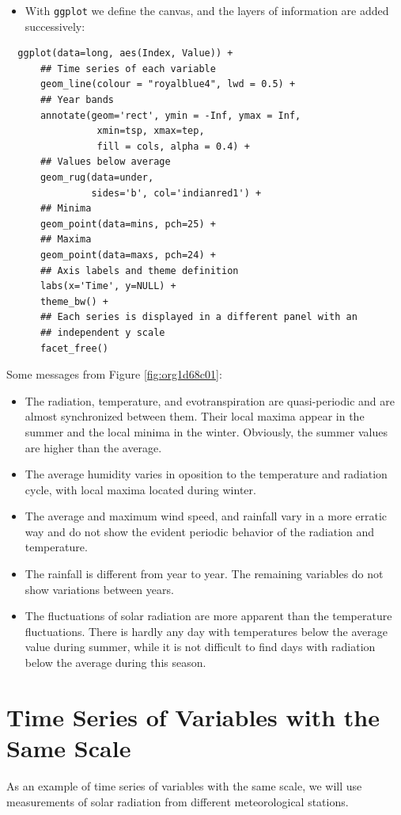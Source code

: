 \documentclass[smallroyalvopaper]{memoir}
\begin{document}
\begin{itemize}
\item With \texttt{ggplot} we define the canvas, and the layers of information are
added successively:
\end{itemize}
\lstset{language=r,label= ,caption= ,captionpos=b,numbers=none}
\begin{lstlisting}
  ggplot(data=long, aes(Index, Value)) +
      ## Time series of each variable
      geom_line(colour = "royalblue4", lwd = 0.5) +
      ## Year bands
      annotate(geom='rect', ymin = -Inf, ymax = Inf,
                xmin=tsp, xmax=tep,
                fill = cols, alpha = 0.4) +
      ## Values below average
      geom_rug(data=under,
               sides='b', col='indianred1') +
      ## Minima
      geom_point(data=mins, pch=25) +
      ## Maxima
      geom_point(data=maxs, pch=24) +
      ## Axis labels and theme definition
      labs(x='Time', y=NULL) +
      theme_bw() +
      ## Each series is displayed in a different panel with an
      ## independent y scale
      facet_free()
\end{lstlisting}

Some messages from Figure \ref{fig:org1d68c01}:
\begin{itemize}
\item The radiation, temperature, and evotranspiration are
quasi-periodic and are almost synchronized between them. Their
local maxima appear in the summer and the local minima in the
winter. Obviously, the summer values are higher than the
average.
\item The average humidity varies in oposition to the temperature and
radiation cycle, with local maxima located during winter.
\item The average and maximum wind speed, and rainfall vary in a more
erratic way and do not show the evident periodic behavior of
the radiation and temperature.
\item The rainfall is different from year to year. The remaining variables
do not show variations between years.
\item The fluctuations of solar radiation are more apparent than
the temperature fluctuations. There is hardly any day with
temperatures below the average value during summer, while it is
not difficult to find days with radiation below the average
during this season.
\end{itemize}

\section{Time Series of Variables with the Same Scale}
\label{sec:orge8d40ac}
\label{SEC:sameScale}
As an example of time series of variables with the same scale, we will
use measurements of solar radiation from different meteorological
stations.
\end{document}
